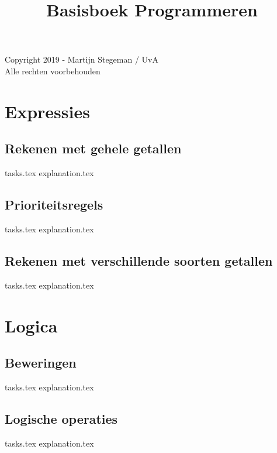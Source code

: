 \documentclass[b5paper,openright,twoside]{report}
\begin{document}
    \title{Basisboek Programmeren}
    \maketitle

    Copyright 2019 - Martijn Stegeman / UvA\\
    Alle rechten voorbehouden

\tableofcontents

    \chapter{Expressies}
    \newpage

    \section{Rekenen met gehele getallen}
    {tasks.tex}            \newpage
    {explanation.tex}      \newpage

    \section{Prioriteitsregels}
    {tasks.tex}          \newpage
    {explanation.tex}    \newpage

    \section{Rekenen met verschillende soorten getallen}
    {tasks.tex}              \newpage
    {explanation.tex}        \newpage

    \chapter{Logica}
    \newpage

    \section{Beweringen}
    {tasks.tex}           \newpage
    {explanation.tex}     \newpage

    \section{Logische operaties}
    {tasks.tex}          \newpage
    {explanation.tex}    \newpage
\end{document}
